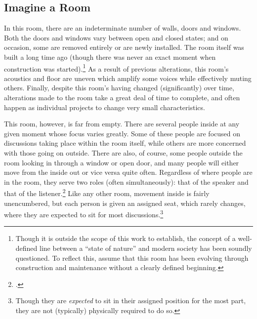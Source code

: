 \documentclass{article}
\begin{document}
\subsection{Imagine a Room}
In this room, there are an indeterminate number of walls, doors and windows.
Both the doors and windows vary between open and closed states; and on occasion, some are removed entirely or are newly installed.
The room itself was built a long time ago (though there was never an exact moment when construction was started).\footnote{Though it is outside the scope of this work to establish, the concept of a well-defined line between a ``state of nature'' and modern society has been soundly questioned. To reflect this, assume that this room has been evolving through construction and maintenance without a clearly defined beginning.}
As a result of previous alterations, this room's acoustics and floor are uneven which amplify some voices while effectively muting others. 
Finally, despite this room's having changed (significantly) over time, alterations made to the room take a great deal of time to complete, and often happen as individual projects to change very small characteristics.

This room, however, is far from empty. There are several people inside at any given moment whose focus varies greatly.
Some of these people are focused on discussions taking place within the room itself, while others are more concerned with those going on outside.
There are also, of course, some people outside the room looking in through a window or open door, and many people will either move from the inside out or vice versa quite often.
Regardless of where people are in the room, they serve two roles (often simultaneously): that of the speaker and that of the listener.\footcite[4]{bickford96}
Like any other room, movement inside is fairly unencumbered, but each person is given an assigned seat, which rarely changes, where they are expected to sit for most discussions.\footnote{Though they are \emph{expected} to sit in their assigned position for the most part, they are not (typically) physically required to do so.}
\end{document}
